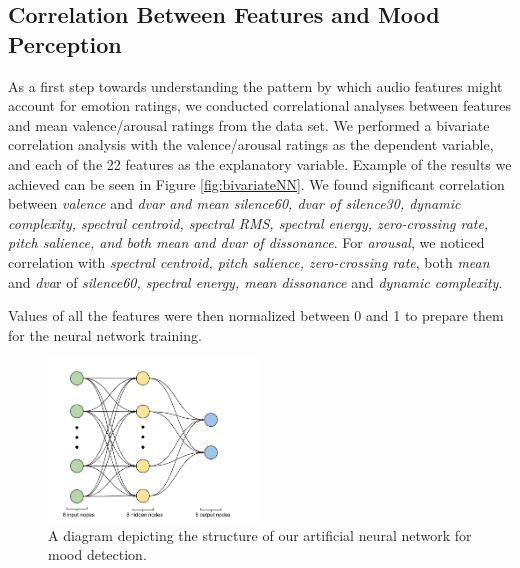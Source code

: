 \vspace{10pt}

\subsection{Correlation Between Features and Mood Perception}

As a first step towards understanding the pattern by which audio features might account for emotion ratings, we conducted correlational analyses between features and mean valence/arousal ratings from the data set. We performed a bivariate correlation analysis with the valence/arousal ratings as the dependent variable, and each of the 22 features as the explanatory variable. Example of the results we achieved can be seen in Figure \ref{fig:bivariateNN}. We found significant correlation between \textit{valence} and \textit{dvar and mean silence60, dvar of silence30, dynamic complexity, spectral centroid, spectral RMS, spectral energy, zero-crossing rate, pitch salience, and both mean and dvar of dissonance}. For \textit{arousal}, we noticed correlation with \textit{spectral centroid, pitch salience, zero-crossing rate}, both \textit{mean} and \textit{dva}r of  \textit{silence60, spectral energy, mean dissonance} and \textit{dynamic complexity}. 

Values of all the features were then normalized between 0 and 1 to prepare them for the neural network training. 



\begin{figure}
  \vspace{-30pt}
  \begin{center}
    \includegraphics[width=0.5\textwidth]{Figures/myANN}
  \end{center}
  \caption{A diagram depicting the structure of our artificial neural network for mood detection.}
\label{finalnetwork}
\end{figure}

\vspace{10pt}

